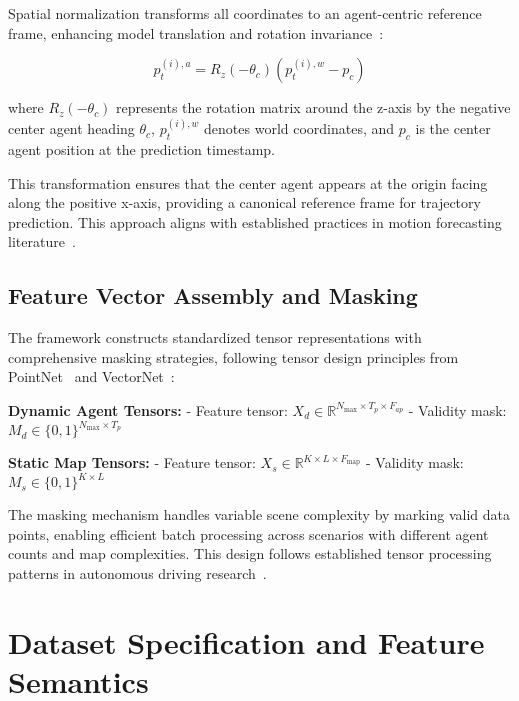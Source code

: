 Spatial normalization transforms all coordinates to an agent-centric reference frame, enhancing model translation and rotation invariance~\cite{qcnetZhou2023, gao2020vectornet}:

\begin{equation}
p_{t}^{(i),a} = R_{z}(-\theta_{c})(p_{t}^{(i),w} - p_{c})
\end{equation}

where $R_{z}(-\theta_{c})$ represents the rotation matrix around the z-axis by the negative center agent heading $\theta_{c}$, $p_{t}^{(i),w}$ denotes world coordinates, and $p_{c}$ is the center agent position at the prediction timestamp.

This transformation ensures that the center agent appears at the origin facing along the positive x-axis, providing a canonical reference frame for trajectory prediction. This approach aligns with established practices in motion forecasting literature~\cite{shi2022motion, DenseTNT2021}.

\subsection{Feature Vector Assembly and Masking}
\label{ssec:feature_assembly}

The framework constructs standardized tensor representations with comprehensive masking strategies, following tensor design principles from PointNet~\cite{PointNet2017} and VectorNet~\cite{VectorNet2020}:

\textbf{Dynamic Agent Tensors:}
- Feature tensor: $X_{d} \in \mathbb{R}^{N_{\max} \times T_{p} \times F_{ap}}$
- Validity mask: $M_{d} \in \{0,1\}^{N_{\max} \times T_{p}}$

\textbf{Static Map Tensors:}
- Feature tensor: $X_{s} \in \mathbb{R}^{K \times L \times F_{\text{map}}}$
- Validity mask: $M_{s} \in \{0,1\}^{K \times L}$

The masking mechanism handles variable scene complexity by marking valid data points, enabling efficient batch processing across scenarios with different agent counts and map complexities. This design follows established tensor processing patterns in autonomous driving research~\cite{SceneTransformer2022}.

\section{Dataset Specification and Feature Semantics}
\label{sec:data_datasetitem}

